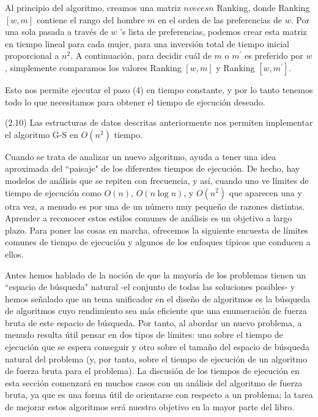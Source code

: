 \documentclass[a4paper, 12pt]{book}
\theoremstyle{dotless}
\begin{document}
Al principio del algoritmo, creamos una matriz $n veces n$ Ranking, donde Ranking $[w, m]$ contiene el rango del hombre $m$ en el orden de las preferencias de $w$. Por una sola pasada a través de $w $ 's lista de preferencias, podemos crear esta matriz en tiempo lineal para cada mujer, para una inversión total de tiempo inicial proporcional a $ n^ {2} $. A continuación, para decidir cuál de $m$ o $m^{\prime}$ es preferido por $w$, simplemente comparamos los valores Ranking $[w, m]$ y Ranking $\left[w, m^{\prime}\right]$.

Esto nos permite ejecutar el paso (4) en tiempo constante, y por lo tanto tenemos todo lo que necesitamos para obtener el tiempo de ejecución deseado.

(2.10) Las estructuras de datos descritas anteriormente nos permiten implementar el algoritmo G-S en $O\left(n^{2}\right)$ tiempo.

Cuando se trata de analizar un nuevo algoritmo, ayuda a tener una idea aproximada del ``paisaje" de los diferentes tiempos de ejecución. De hecho, hay modelos de análisis que se repiten con frecuencia, y así, cuando uno ve límites de tiempo de ejecución como $O(n)$, $O(n \log n)$, y $O\left(n^{2}\right)$ que aparecen una y otra vez, a menudo es por una de un número muy pequeño de razones distintas. Aprender a reconocer estos estilos comunes de análisis es un objetivo a largo plazo. Para poner las cosas en marcha, ofrecemos la siguiente encuesta de límites comunes de tiempo de ejecución y algunos de los enfoques típicos que conducen a ellos.

Antes hemos hablado de la noción de que la mayoría de los problemas tienen un ``espacio de búsqueda" natural -el conjunto de todas las soluciones posibles- y hemos señalado que un tema unificador en el diseño de algoritmos es la búsqueda de algoritmos cuyo rendimiento sea más eficiente que una enumeración de fuerza bruta de este espacio de búsqueda. Por tanto, al abordar un nuevo problema, a menudo resulta útil pensar en dos tipos de límites: uno sobre el tiempo de ejecución que se espera conseguir y otro sobre el tamaño del espacio de búsqueda natural del problema (y, por tanto, sobre el tiempo de ejecución de un algoritmo de fuerza bruta para el problema). La discusión de los tiempos de ejecución en esta sección comenzará en muchos casos con un análisis del algoritmo de fuerza bruta, ya que es una forma útil de orientarse con respecto a un problema; la tarea de mejorar estos algoritmos será nuestro objetivo en la mayor parte del libro.
\end{document}
